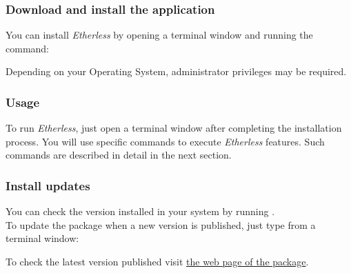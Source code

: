     \subsubsection{Download and install the application}
    You can install \textit{Etherless} by opening a terminal window and running the command:
     \begin{center}
     \end{center}
     Depending on your Operating System, administrator privileges may be required. \\
         \subsubsection{Usage}
      To run \textit{Etherless}, just open a terminal window after completing the installation process. You will use specific commands to execute \textit{Etherless} features. Such commands are described in detail in the next section.
      
     \subsubsection{Install updates}
     You can check the version installed in your system by running . \\
     To update the package when a new version is published, just type from a terminal window:
	\begin{center}
	\end{center}
	To check the latest version published visit \href{https://www.npmjs.com/package/@roundabout-team/etherless-cli}{the web page of the package}.
